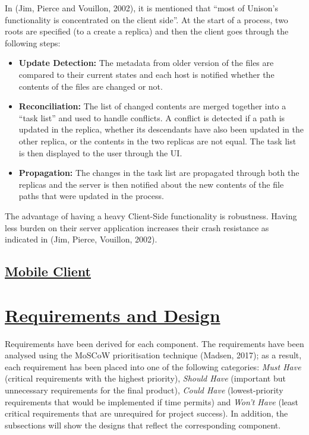 \documentclass{article}
\begin{document}
In (Jim, Pierce and Vouillon, 2002), it is mentioned that “most of Unison’s functionality is concentrated on the client side”. At the start of a process, two roots are specified (to a create a replica) and then the client goes through the following steps:
\begin{itemize}
\item \textbf{Update Detection:} The metadata from older version of the files are compared to their current states and each host is notified whether the contents of the files are changed or not.
\item \textbf{Reconciliation:} The list of changed contents are merged together into a “task list” and used to handle conflicts. A conflict is detected if a path is updated in the replica, whether its descendants have also been updated in the other replica, or the contents in the two replicas are not equal. The task list is then displayed to the user through the UI. 
\item \textbf{Propagation:} The changes in the task list are propagated through both the replicas and the server is then notified about the new contents of the file paths that were updated in the process. 
\end{itemize}
The advantage of having a heavy Client-Side functionality is robustness. Having less burden on their server application increases their crash resistance as indicated in (Jim, Pierce, Vouillon, 2002). 

\subsection{\underline{Mobile Client}}

\section{\underline{Requirements and Design}}
Requirements have been derived for each component. The requirements have been analysed using the MoSCoW prioritisation technique (Madsen, 2017); as a result, each requirement has been placed into one of the following categories: \textit{Must Have} (critical requirements with the highest priority), \textit{Should Have} (important but unnecessary requirements for the final product), \textit{Could Have} (lowest-priority requirements that would be implemented if time permits) and \textit{Won't Have} (least critical requirements that are unrequired for project success). In addition, the subsections will show the designs that reflect the corresponding component.
\end{document}
